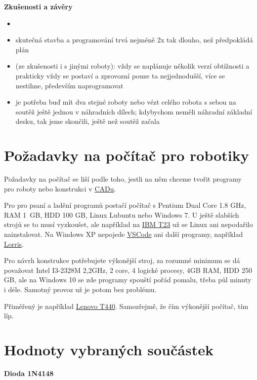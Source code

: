 {\bf Zkušenosti a závěry}
	\vspace{-0.7cm} 
	\begin{itemize}
		\item[]
		\item  skutečná stavba a programování trvá nejméně 2x tak dlouho, než předpokládá plán 
		\item (ze zkušenosti i s jinými roboty): vždy se naplánuje několik verzí obtížnosti a prakticky vždy se postaví a zprovozní pouze ta nejjednodušší, více se nestihne, především naprogramovat  
		\item je potřeba buď mít dva stejné roboty nebo vézt celého robota s sebou na soutěž ještě jednou v náhradních dílech; kdybychom neměli náhradní základní desku, tak jsme skončili, ještě než soutěž začala  
	\end{itemize}


\section{Požadavky na počítač pro robotiky} \label{pocitac}

Požadavky na počítač se liší podle toho, jestli na něm chceme tvořit programy pro roboty nebo konstrukci v \hyperref[cad]{CADu}. 

Pro pro psaní a ladění programů postačí počítač s Pentium Dual Core 1.8 GHz, RAM 1~GB, HDD 100 GB, Linux Lubuntu nebo Windows 7. 
U ještě slabších strojů se to musí vyzkoušet, ale například na \href{https://en.wikipedia.org/wiki/IBM_ThinkPad_T20_series}{IBM T23} už se Linux  ani nepodařilo nainstalovat. 
Na Windows XP nepojede  \hyperref[vscode]{VSCode}  ani další programy, například \hyperref[lorris]{Lorris}. 

Pro návrh konstrukce potřebujete výkonější stroj, za rozumné minimum se dá považovat Intel I3-2328M 2,2GHz, 2 core, 4 logické procesy, 4GB RAM, HDD 250 GB, 
 ale na Windows 10 se zde programy spouští pořád pomalu, třeba půl minuty i déle. 
Samotný provoz už je potom bez problému. 

Přiměřený je například \href{https://www.lenovo.com/gb/en/laptops/thinkpad/t-series/t440/}{Lenovo T440}. Samozřejmě, že čím výkonější počítač, tím líp.  




\section{Hodnoty vybraných součástek}


\hypertarget{1N4148}{}
{\bf Dioda 1N4148}  

